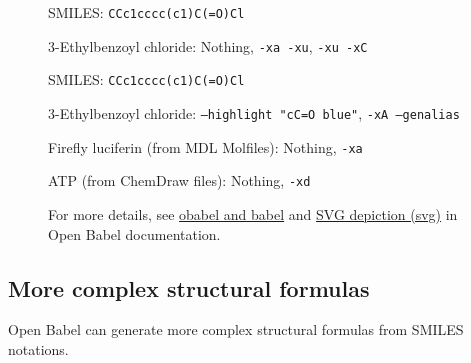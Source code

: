 \documentclass[12pt]{ltjsarticle}
\begin{document}
\begin{figure}[ht]
  \centering
   \hspace{1cm}
   \hspace{1cm}
  \caption{3-Ethylbenzoyl chloride: Nothing, \texttt{-xa -xu}, \texttt{-xu -xC}}
  SMILES: \verb|CCc1cccc(c1)C(=O)Cl|
\end{figure}

\begin{figure}[ht]
  \centering
   \hspace{1cm}
  \caption{3-Ethylbenzoyl chloride: \texttt{--highlight "cC=O blue"}, \texttt{-xA --genalias}}
  SMILES: \verb|CCc1cccc(c1)C(=O)Cl|
\end{figure}

\begin{figure}[ht]
  \centering
   \hspace{1cm}
  \caption{Firefly luciferin (from MDL Molfiles): Nothing, \texttt{-xa}}
\end{figure}

\begin{figure}[ht]
  \centering
   \hspace{1cm}
  \caption{ATP (from ChemDraw files): Nothing, \texttt{-xd}}
\end{figure}

\begin{figure}[ht]
For more details, see
\href{http://openbabel.org/docs/dev/Command-line_tools/babel.html}{obabel and babel}
and
\href{http://openbabel.org/docs/dev/FileFormats/SVG_2D_depiction.html}{SVG depiction (svg)}
in Open Babel documentation.
\end{figure}

\clearpage

\subsection{More complex structural formulas}

Open Babel can generate more complex structural formulas from SMILES notations.
\end{document}
